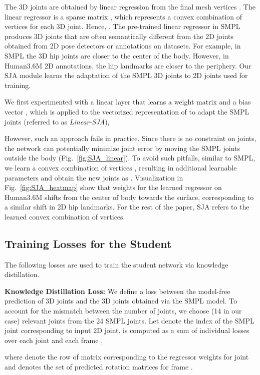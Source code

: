 \documentclass[10pt,twocolumn,letterpaper]{article}
\begin{document}
The 3D joints  are obtained by linear regression from the final mesh vertices . The linear regressor is a sparse matrix , which represents a convex combination of vertices for each 3D joint. Hence, . The pre-trained linear regressor in SMPL produces 3D joints that are often semantically different from the 2D joints obtained from 2D pose detectors or annotations on datasets. For example, in SMPL the 3D hip joints are closer to the center of the body. However, in Human3.6M 2D annotations, the hip landmarks are closer to the periphery. 
Our SJA module learns the adaptation of the SMPL 3D joints to 2D joints used for training. 

We first experimented with a linear layer that learns a weight matrix  and a bias vector , which is applied to the  vectorized representation of  to adapt the SMPL joints (referred to as \textit{Linear-SJA}),

However, such an approach fails in practice. Since there is no constraint on joints, the network can potentially minimize joint error by moving the SMPL joints outside the body (Fig.~\ref{fig:SJA_linear}). To avoid such pitfalls, similar to SMPL, we learn a convex combination of vertices , resulting in  additional learnable parameters and obtain the new joints as . Visualization in Fig.~\ref{fig:SJA_heatmap} show that weights for the learned regressor on Human3.6M shifts from the center of body towards the surface, corresponding to a similar shift in 2D hip landmarks. For the rest of the paper, SJA refers to the learned convex combination of vertices.

\subsection{Training Losses for the  Student}

The following losses are used to train the student network via knowledge distillation. 


\noindent\textbf{Knowledge Distillation Loss:} We define a loss between the model-free prediction of 3D joints  and the 3D joints obtained via the SMPL model. To account for the mismatch between the number of joints, we choose  (14 in our case) relevant joints from the 24 SMPL joints. Let  denote the index of the SMPL joint corresponding to  input 2D joint.  is computed as a sum of individual losses over each joint  and each frame ,

where  denote the row of matrix  corresponding to the regressor weights for joint  and  denotes the set of predicted rotation matrices for frame . 
\end{document}
